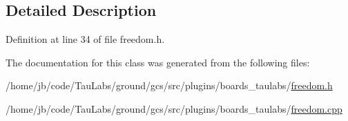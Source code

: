 \subsection{\-Detailed \-Description}


\-Definition at line 34 of file freedom.\-h.



\-The documentation for this class was generated from the following files\-:\begin{DoxyCompactItemize}
\item 
/home/jb/code/\-Tau\-Labs/ground/gcs/src/plugins/boards\-\_\-taulabs/\hyperlink{freedom_8h}{freedom.\-h}\item 
/home/jb/code/\-Tau\-Labs/ground/gcs/src/plugins/boards\-\_\-taulabs/\hyperlink{freedom_8cpp}{freedom.\-cpp}\end{DoxyCompactItemize}
